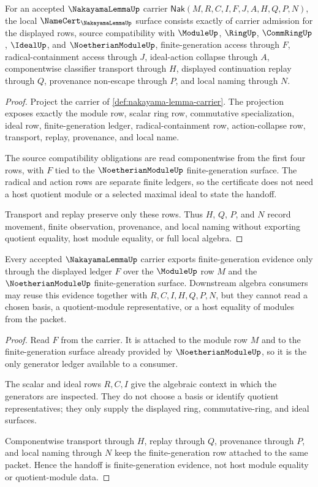 \begin{theorem}
\label{thm:nakayama-lemma-namecert-obligations}
For an accepted $\NakayamaLemmaUp$ carrier
$\mathsf{Nak}(M,R,C,I,F,J,A,H,Q,P,N)$, the local
$\NameCert_{\NakayamaLemmaUp}$ surface consists exactly of carrier admission
for the displayed rows, source compatibility with $\ModuleUp$, $\RingUp$,
$\CommRingUp$, $\IdealUp$, and $\NoetherianModuleUp$, finite-generation access
through $F$, radical-containment access through $J$, ideal-action collapse
through $A$, componentwise classifier transport through $H$, displayed
continuation replay through $Q$, provenance non-escape through $P$, and local
naming through $N$.
\end{theorem}
\begin{proof}
Project the carrier of \autoref{def:nakayama-lemma-carrier}. The projection
exposes exactly the module row, scalar ring row, commutative specialization,
ideal row, finite-generation ledger, radical-containment row, action-collapse
row, transport, replay, provenance, and local name.

The source compatibility obligations are read componentwise from the first
four rows, with $F$ tied to the $\NoetherianModuleUp$ finite-generation surface.
The radical and action rows are separate finite ledgers, so the certificate
does not need a host quotient module or a selected maximal ideal to state the
handoff.

Transport and replay preserve only these rows. Thus $H$, $Q$, $P$, and $N$
record movement, finite observation, provenance, and local naming without
exporting quotient equality, host module equality, or full local algebra.
\end{proof}

\begin{theorem}
\label{thm:nakayama-lemma-finite-generation-handoff}
Every accepted $\NakayamaLemmaUp$ carrier exports finite-generation evidence
only through the displayed ledger $F$ over the $\ModuleUp$ row $M$ and the
$\NoetherianModuleUp$ finite-generation surface. Downstream algebra consumers
may reuse this evidence together with $R,C,I,H,Q,P,N$, but they cannot read a
chosen basis, a quotient-module representative, or a host equality of modules
from the packet.
\end{theorem}
\begin{proof}
Read $F$ from the carrier. It is attached to the module row $M$ and to the
finite-generation surface already provided by $\NoetherianModuleUp$, so it is
the only generator ledger available to a consumer.

The scalar and ideal rows $R,C,I$ give the algebraic context in which the
generators are inspected. They do not choose a basis or identify quotient
representatives; they only supply the displayed ring, commutative-ring, and
ideal surfaces.

Componentwise transport through $H$, replay through $Q$, provenance through
$P$, and local naming through $N$ keep the finite-generation row attached to
the same packet. Hence the handoff is finite-generation evidence, not host
module equality or quotient-module data.
\end{proof}


